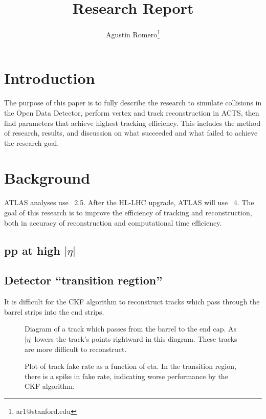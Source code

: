\documentclass{article}
\title{Research Report}
\author{Agustin Romero\thanks{ar1@stanford.edu}}
\newcommand{\pic}[2]{\beg{center}{\texttt{[image: \#2]}}}
\newcommand{\figpic}[3]{
\begin{figure}[H]
\begin{center}
\pic{#1}{#2}
\caption{#3}
\end{center}
\end{figure}}
\begin{document}
\maketitle
\section{Introduction}
The purpose of this paper is to fully describe the research to simulate \ttbar collisions in the Open Data Detector, perform vertex and track reconstruction in ACTS, then find parameters that achieve highest tracking efficiency. This includes the method of research, results, and discussion on what succeeded and what failed to achieve the research goal.
\section{Background}
ATLAS analyses use \abseta~2.5. After the HL-LHC upgrade, ATLAS will use \abseta~4. The goal of this research is to improve the efficiency of tracking and reconstruction, both in accuracy of reconstruction and computational time efficiency.
\subsection{pp at high $|\eta|$}
\subsection{Detector ``transition regtion''}
It is difficult for the CKF algorithm to reconstruct tracks which pass through the barrel strips into the end strips.
\figpic{5cm}{2.png}{Diagram of a track which passes from the barrel to the end cap. As $|\eta|$ lowers the track's points rightward in this diagram. These tracks are more difficult to reconstruct.}
\figpic{5cm}{3.png}{Plot of track fake rate as a function of eta. In the transition region, there is a spike in fake rate, indicating worse performance by the CKF algorithm.}
\end{document}
